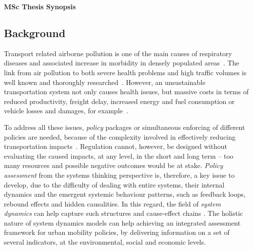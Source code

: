 \documentclass[a4paper,fontsize=10pt,bibliography=totoc]{scrartcl}
\newcommand{\titlemake}[1]{%
		\begin{center}
				\Large\sffamily\bfseries{#1}
		\end{center}
}
\newcommand{\subtitlemake}[1]{%
	\begin{center}
		\begingroup
			\large\sffamily{#1}
		\endgroup
	\end{center}
}
\begin{document}
\pagestyle{fancy}
\fancyhf{} %
\rhead{\footnotesize \today}
\rfoot{\footnotesize \thepage}

\titlemake{ %
MSc Thesis Synopsis
}

\begin{multicols}{2}
\section{Background}
\label{s:background}
Transport related airborne pollution is one of the main causes of respiratory diseases and associated increase in morbidity in densely populated areas~\parencite{vimercati2011_Trafficrelatedair,who2006_Airqualityguidelines}. The link from air pollution to both severe health problems and high traffic volumes is well known and thoroughly researched~\parencite{who2006_Airqualityguidelines}. However, an unsustainable transportation system not only causes health issues, but massive costs in terms of reduced productivity, freight delay, increased energy and fuel consumption or vehicle losses and damages, for example~\parencite{li-zeng2012_SocialCostTraffic}.

To address all these issues, \textit{policy} packages or simultaneous enforcing of different policies are needed, because of the complexity involved in effectively reducing transportation impacts~\parencite[ch. 3, p. 45]{garciasierra2014_Travelbehaviourenvironmental}. Regulation cannot, however, be designed without evaluating the caused impacts, at any level, in the short and long term -- too many resources and possible negative outcomes would be at stake. \textit{Policy assessment} from the systems thinking perspective is, therefore, a key issue to develop, due to the difficulty of dealing with entire systems, their internal dynamics and the emergent systemic behaviour patterns, such as feedback loops, rebound effects and hidden causalities. In this regard, the field of \textit{system dynamics} can help capture such structures and cause-effect chains \parencite{hjorth2006_Navigatingtowardssustainable}. The holistic nature of system dynamics models can help achieving an integrated assessment framework for urban mobility policies, by delivering information on a set of several indicators, at the environmental, social and economic levels.


\end{multicols}
\end{document}
